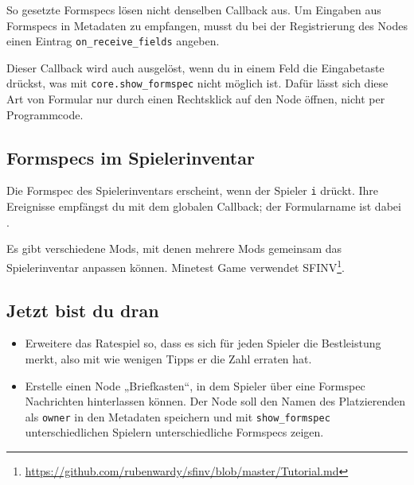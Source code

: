 So gesetzte Formspecs lösen nicht denselben Callback aus. Um Eingaben
aus Formspecs in Metadaten zu empfangen, musst du bei der Registrierung
des Nodes einen Eintrag
\texttt{on\_\allowbreak{}receive\_\allowbreak{}fields} angeben.

Dieser Callback wird auch ausgelöst, wenn du in einem Feld die
Eingabetaste drückst, was mit
\texttt{core.\allowbreak{}show\_\allowbreak{}formspec} nicht möglich
ist. Dafür lässt sich diese Art von Formular nur durch einen Rechtsklick
auf den Node öffnen, nicht per Programmcode.

\subsection{Formspecs im
Spielerinventar}\label{formspecs-im-spielerinventar}

Die Formspec des Spielerinventars erscheint, wenn der Spieler \texttt{i}
drückt. Ihre Ereignisse empfängst du mit dem globalen Callback; der
Formularname ist dabei \texttt{\textquotedbl{}\textquotedbl{}}.

Es gibt verschiedene Mods, mit denen mehrere Mods gemeinsam das
Spielerinventar anpassen können. Minetest Game verwendet
SFINV\footnote{\url{https://github.com/rubenwardy/sfinv/blob/master/Tutorial.md}}.

\subsection{Jetzt bist du dran}\label{jetzt-bist-du-dran}

\begin{itemize}
\tightlist
\item
  Erweitere das Ratespiel so, dass es sich für jeden Spieler die
  Bestleistung merkt, also mit wie wenigen Tipps er die Zahl erraten
  hat.
\item
  Erstelle einen Node „Briefkasten``, in dem Spieler über eine Formspec
  Nachrichten hinterlassen können. Der Node soll den Namen des
  Platzierenden als \texttt{owner} in den Metadaten speichern und mit
  \texttt{show\_\allowbreak{}formspec} unterschiedlichen Spielern
  unterschiedliche Formspecs zeigen.
\end{itemize}
